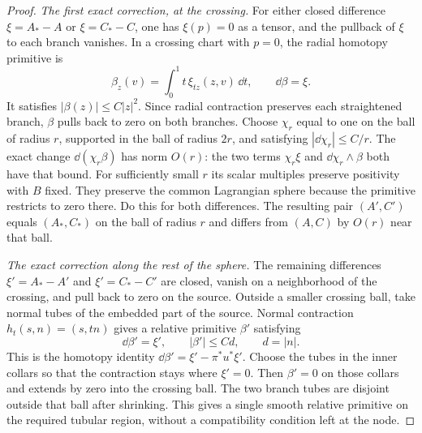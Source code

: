 \begin{proof}
\emph{The first exact correction, at the crossing.}
For either closed difference $\xi=A_*-A$ or $\xi=C_*-C$, one has
$\xi(p)=0$ as a tensor, and the pullback of $\xi$ to each branch
vanishes.  In a crossing chart with $p=0$, the radial homotopy
primitive is
\begin{equation}\label{eq:pencil-radial-primitive}
 \beta_z(v)=\int_0^1 t\,\xi_{tz}(z,v)\,\dd t,
 \qquad \dd\beta=\xi.
\end{equation}
It satisfies $|\beta(z)|\leq C|z|^2$.  Since radial contraction
preserves each straightened branch, $\beta$ pulls back to zero on
both branches.  Choose $\chi_r$ equal to one on the ball of radius
$r$, supported in the ball of radius $2r$, and satisfying
$|\dd\chi_r|\leq C/r$.  The exact change
$\dd(\chi_r\beta)$ has norm $O(r)$: the two terms
$\chi_r\xi$ and $\dd\chi_r\wedge\beta$ both have that bound.
For sufficiently small $r$ its scalar multiples preserve positivity
with $B$ fixed.  They preserve the common Lagrangian sphere because
the primitive restricts to zero there.  Do this for both differences.
The resulting pair $(A',C')$ equals $(A_*,C_*)$ on the ball of
radius $r$ and differs from $(A,C)$ by $O(r)$ near that ball.

\emph{The exact correction along the rest of the sphere.}
The remaining differences $\xi'=A_*-A'$ and $\xi'=C_*-C'$ are
closed, vanish on a neighborhood of the crossing, and pull back to
zero on the source.  Outside a smaller crossing ball, take normal
tubes of the embedded part of the source.  Normal contraction
$h_t(s,n)=(s,tn)$ gives a relative primitive $\beta'$ satisfying
\begin{equation}\label{eq:pencil-tubular-primitive}
 \dd\beta'=\xi',\qquad
 |\beta'|\leq C d,
 \qquad d=|n|.
\end{equation}
This is the homotopy identity
$\dd\beta'=\xi'-\pi^*u^*\xi'$.  Choose the tubes in the inner
collars so that the contraction stays where $\xi'=0$.  Then
$\beta'=0$ on those collars and extends by zero into the crossing
ball.  The two branch tubes are disjoint outside that ball after
shrinking.  This gives a single smooth relative primitive on the
required tubular region, without a compatibility condition left at
the node.


\end{proof}
